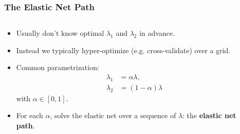 \documentclass[10pt]{beamer}
\begin{document}
\begin{frame}[c]
  \frametitle{The Elastic Net Path}

  \begin{columns}
    \begin{column}{0.45\textwidth}
      \begin{itemize}[<+->]
        \item Usually don't know optimal \(\lambda_1\) and \(\lambda_2\) in advance.
        \item Instead we typically hyper-optimize (e.g. cross-validate) over a grid.
        \item Common parametrization:
              \begin{align*}
                \lambda_1 & = \alpha\lambda,     \\
                \lambda_2 & = (1- \alpha)\lambda
              \end{align*}
              with \(\alpha \in [0, 1]\).
        \item For each \(\alpha\), solve the elastic net over a sequence of \(\lambda\): the \textbf{elastic net path}.
      \end{itemize}
    \end{column}
    \begin{column}{0.45\textwidth}
    \end{column}
  \end{columns}

\end{frame}
\end{document}

